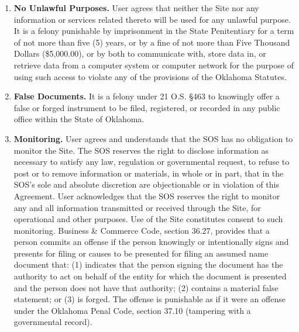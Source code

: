 \begin{enumerate}
    \item \textbf{No Unlawful Purposes.} User agrees that neither the Site nor
    any information or services related thereto will be used for any unlawful
    purpose. It is a felony punishable by imprisonment in the State Penitentiary
    for a term of not more than five (5) years, or by a fine of not more than
    Five Thousand Dollars (\$5,000.00), or by both to communicate with, store
    data in, or retrieve data from a computer system or computer network for the
    purpose of using such access to violate any of the provisions of the
    Oklahoma Statutes.

    \item \textbf{False Documents.} It is a felony under 21 O.S. §463 to
    knowingly offer a false or forged instrument to be filed, registered, or
    recorded in any public office within the State of Oklahoma.

    \item \textbf{Monitoring.} User agrees and understands that the SOS has no obligation
    to monitor the Site. The SOS reserves the right to disclose information as
    necessary to satisfy any law, regulation or governmental request, to refuse
    to post or to remove information or materials, in whole or in part, that in
    the SOS's sole and absolute discretion are objectionable or in violation of
    this Agreement. User acknowledges that the SOS reserves the right to monitor
    any and all information transmitted or received through the Site, for
    operational and other purposes. Use of the Site constitutes consent to such
    monitoring. Business \& Commerce Code, section 36.27, provides that a person
    commits an offense if the person knowingly or intentionally signs and
    presents for filing or causes to be presented for filing an assumed name
    document that: (1) indicates that the person signing the document has the
    authority to act on behalf of the entity for which the document is presented
    and the person does not have that authority; (2) contains a material false
    statement; or (3) is forged. The offense is punishable as if it were an
    offense under the Oklahoma Penal Code, section 37.10 (tampering with a
    governmental record).


\end{enumerate}
